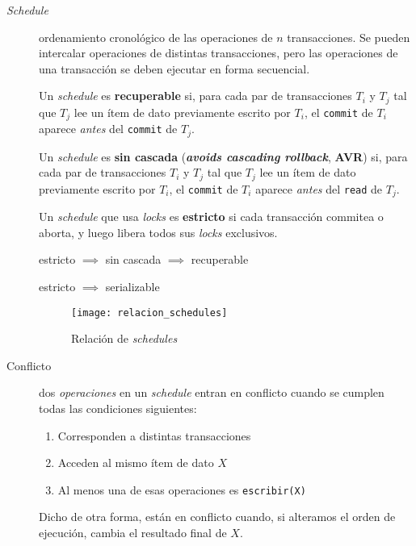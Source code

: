 \documentclass[a4paper, twoside]{article}
\begin{document}
\begin{description}
	\item [{\emph{Schedule}}] ordenamiento cronológico de las operaciones de $n$ transacciones. Se pueden intercalar operaciones de distintas transacciones, pero las operaciones de una transacción se deben ejecutar en forma secuencial.

	Un \emph{schedule} es \textbf{recuperable} si, para cada par de transacciones $T_{i}$ y $T_{j}$ tal que $T_{j}$ lee un ítem de dato previamente escrito por $T_{i}$, el \texttt{commit} de $T_{i}$ aparece \emph{antes} del \texttt{commit} de $T_{j}$.

	Un \emph{schedule} es \textbf{sin cascada} (\textbf{\emph{avoids cascading rollback}}, \textbf{AVR}) si, para cada par de transacciones $T_{i}$ y $T_{j}$ tal que $T_{j}$ lee un ítem de dato previamente escrito por $T_{i}$, el \texttt{commit} de $T_{i}$ aparece \emph{antes} del \texttt{read} de $T_{j}$. 

	Un \emph{schedule} que usa \emph{locks }es \textbf{estricto} si cada transacción commitea o aborta, y luego libera todos sus \emph{locks} exclusivos.

	\begin{center}
		estricto $\implies$ sin cascada $\implies$ recuperable
	\end{center}

	\begin{center}
		estricto $\implies$ serializable
	\end{center}

	\begin{figure}[H]
		\centering
		\texttt{[image: relacion\_schedules]}
		\caption{Relación de \emph{schedules}}
	\end{figure}

	\item[Conflicto] dos \emph{operaciones} en un \emph{schedule} entran en conflicto cuando se cumplen todas las condiciones siguientes:
	\begin{enumerate}
		\item Corresponden a distintas transacciones
		\item Acceden al mismo ítem de dato $X$
		\item Al menos una de esas operaciones es \texttt{escribir(X)}
	\end{enumerate}

	Dicho de otra forma, están en conflicto cuando, si alteramos el orden de ejecución, cambia el resultado final de $X$.
\end{description}
\end{document}
